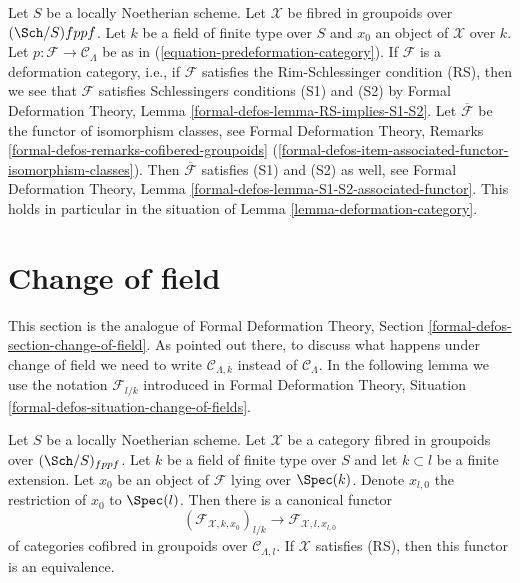 \begin{remark}
\label{remark-deformation-category-implies}
Let $S$ be a locally Noetherian scheme. Let $\mathcal{X}$ be fibred
in groupoids over $(\Sch/S){fppf}$. Let $k$ be a field of finite type over
$S$ and $x_0$ an object
of $\mathcal{X}$ over $k$. Let $p : \mathcal{F} \to \mathcal{C}_\Lambda$
be as in (\ref{equation-predeformation-category}). If $\mathcal{F}$
is a deformation category, i.e., if $\mathcal{F}$ satisfies the
Rim-Schlessinger condition (RS), then we see that $\mathcal{F}$ satisfies
Schlessingers conditions (S1) and (S2) by
Formal Deformation Theory, Lemma \ref{formal-defos-lemma-RS-implies-S1-S2}.
Let $\overline{\mathcal{F}}$ be the functor of isomorphism classes, see
Formal Deformation Theory, Remarks
\ref{formal-defos-remarks-cofibered-groupoids}
(\ref{formal-defos-item-associated-functor-isomorphism-classes}).
Then $\overline{\mathcal{F}}$ satisfies (S1) and (S2) as well, see
Formal Deformation Theory, Lemma
\ref{formal-defos-lemma-S1-S2-associated-functor}.
This holds in particular in the situation of
Lemma \ref{lemma-deformation-category}.
\end{remark}




\section{Change of field}
\label{section-change-of-field}

\noindent
This section is the analogue of
Formal Deformation Theory, Section \ref{formal-defos-section-change-of-field}.
As pointed out there, to discuss what happens under change of field
we need to write $\mathcal{C}_{\Lambda, k}$ instead of $\mathcal{C}_\Lambda$.
In the following lemma we use the notation $\mathcal{F}_{l/k}$
introduced in Formal Deformation Theory, Situation
\ref{formal-defos-situation-change-of-fields}.

\begin{lemma}
\label{lemma-change-of-field}
Let $S$ be a locally Noetherian scheme. Let $\mathcal{X}$ be a category
fibred in groupoids over $(\Sch/S)_{fppf}$. Let $k$ be a
field of finite type over $S$ and let $k \subset l$ be a finite extension.
Let $x_0$ be an object of $\mathcal{F}$ lying over $\Spec(k)$.
Denote $x_{l, 0}$ the restriction of $x_0$ to $\Spec(l)$.
Then there is a canonical functor
$$
(\mathcal{F}_{\mathcal{X}, k , x_0})_{l/k}
\longrightarrow
\mathcal{F}_{\mathcal{X}, l, x_{l, 0}}
$$
of categories cofibred in groupoids over $\mathcal{C}_{\Lambda, l}$.
If $\mathcal{X}$ satisfies (RS), then this functor is an equivalence.
\end{lemma}


